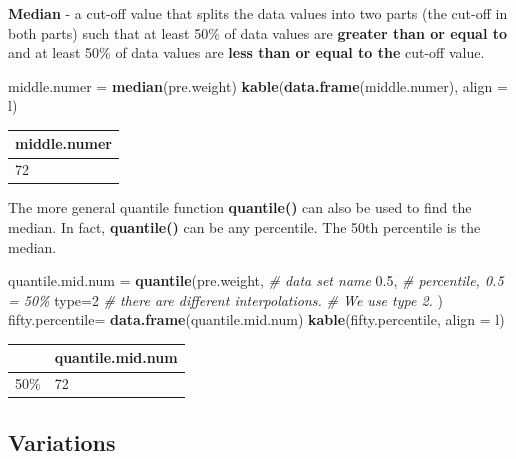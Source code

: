 \documentclass[
]{book}
\newenvironment{Shaded}{\begin{snugshade}}{\end{snugshade}}
\newcommand{\AttributeTok}[1]{\textcolor[rgb]{0.13,0.29,0.53}{#1}}
\newcommand{\CommentTok}[1]{\textcolor[rgb]{0.56,0.35,0.01}{\textit{#1}}}
\newcommand{\DecValTok}[1]{\textcolor[rgb]{0.00,0.00,0.81}{#1}}
\newcommand{\FloatTok}[1]{\textcolor[rgb]{0.00,0.00,0.81}{#1}}
\newcommand{\FunctionTok}[1]{\textcolor[rgb]{0.13,0.29,0.53}{\textbf{#1}}}
\newcommand{\NormalTok}[1]{#1}
\newcommand{\OtherTok}[1]{\textcolor[rgb]{0.56,0.35,0.01}{#1}}
\newcommand{\StringTok}[1]{\textcolor[rgb]{0.31,0.60,0.02}{#1}}
\begin{document}
\textbf{Median} - a cut-off value that splits the data values into two parts (the cut-off in both parts) such that at least 50\% of data values are \textbf{greater than or equal to} and at least 50\% of data values are \textbf{less than or equal to the} cut-off value.

\begin{Shaded}
\begin{Highlighting}[]
\NormalTok{middle.numer }\OtherTok{=} \FunctionTok{median}\NormalTok{(pre.weight)}
\FunctionTok{kable}\NormalTok{(}\FunctionTok{data.frame}\NormalTok{(middle.numer), }\AttributeTok{align =} \StringTok{\textquotesingle{}l\textquotesingle{}}\NormalTok{)}
\end{Highlighting}
\end{Shaded}

\begin{tabular}{l}
\hline
middle.numer\\
\hline
72\\
\hline
\end{tabular}

The more general quantile function \textbf{quantile()} can also be used to find the median. In fact, \textbf{quantile()} can be any percentile. The 50th percentile is the median.

\begin{Shaded}
\begin{Highlighting}[]
\NormalTok{quantile.mid.num }\OtherTok{=} \FunctionTok{quantile}\NormalTok{(pre.weight, }\CommentTok{\# data set name}
                            \FloatTok{0.5}\NormalTok{,        }\CommentTok{\# percentile, 0.5 = 50\%}
                            \AttributeTok{type=}\DecValTok{2}      \CommentTok{\# there are different interpolations. }
                                        \CommentTok{\# We use type 2.}
\NormalTok{                            )}
\NormalTok{fifty.percentile}\OtherTok{=} \FunctionTok{data.frame}\NormalTok{(quantile.mid.num)}
\FunctionTok{kable}\NormalTok{(fifty.percentile, }\AttributeTok{align =} \StringTok{\textquotesingle{}l\textquotesingle{}}\NormalTok{)}
\end{Highlighting}
\end{Shaded}

\begin{tabular}{l|l}
\hline
  & quantile.mid.num\\
\hline
50\% & 72\\
\hline
\end{tabular}

\hypertarget{variations}{%
\subsection{Variations}\label{variations}}
\end{document}
